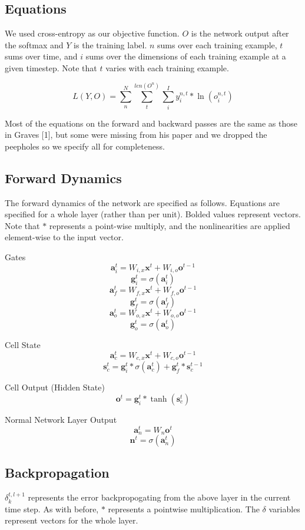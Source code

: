 \documentclass[11pt]{article}
\begin{document}
\subsection{Equations}

We used cross-entropy as our objective function. \(O\) is the network
output after the softmax and \(Y\) is the training label. \(n\) sums over each
training example, \(t\) sums over time, and \(i\) sums over the dimensions
of each training example at a given timestep.
Note that \(t\) varies with each training example.

\[  L(Y, O) = \sum_{n}^{N}  \sum_{t}^{len(O^{n})} \sum_{i}^{I} y_{i}^{n,t}*\ln(o_{i}^{n,t}) \]

Most of the equations on the forward and backward passes are the
same as those in Graves [1], but some were missing from his paper
and we dropped the peepholes so we specify all for completeness.

\subsection{Forward Dynamics}
The forward dynamics of the network are specified as follows. Equations
are specified for a whole layer (rather than per unit).
 Bolded values represent vectors. Note that \(*\)
represents a point-wise multiply, and the nonlinearities are applied
element-wise to the input vector.

Gates
\[ \textbf{a}_{i}^{t} = W_{i,x}\textbf{x}^{t} +  W_{i,o}\textbf{o}^{t-1} \] 
\[ \textbf{g}_{i}^{t} = \sigma( \textbf{a}_{i}^{t}) \]
\[ \textbf{a}_{f}^{t} = W_{f,x}\textbf{x}^{t} +  W_{f,o}\textbf{o}^{t-1} \] 
\[ \textbf{g}_{f}^{t} = \sigma( \textbf{a}_{f}^{t}) \]
\[ \textbf{a}_{o}^{t} = W_{o,x}\textbf{x}^{t} +  W_{o,o}\textbf{o}^{t-1} \] 
\[ \textbf{g}_{o}^{t} = \sigma( \textbf{a}_{o}^{t}) \]

Cell State
\[ \textbf{a}_{c}^{t} = W_{c,x}\textbf{x}^{t} +  W_{c,o}\textbf{o}^{t-1} \] 
\[ \textbf{s}_{c}^{t} =  \textbf{g}_{i}^{t} * \sigma( \textbf{a}_{c}^{t}) + \textbf{g}_{f}^{t}*\textbf{s}_{c}^{t-1} \]

Cell Output (Hidden State)
\[ \textbf{o}^{t} =  \textbf{g}_{i}^{t} * \tanh( \textbf{s}_{c}^{t}) \]

Normal Network Layer Output
\[ \textbf{a}_{n}^{t} = W_{n}\textbf{o}^{t} \]
\[ \textbf{n}^{t} = \sigma( \textbf{a}_{n}^{t}) \]

\subsection{Backpropagation}
\(\delta_{k}^{t,l+1}\) represents the error backpropogating from the above layer
in the current time step. 
As with before, \(*\) represents a pointwise multiplication. The \(\delta\) variables
represent vectors for the whole layer.
\end{document}
